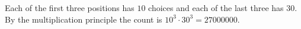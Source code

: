 Each of the first three positions has $10$ choices and each of the last three has $30$. By the multiplication principle the count is $10^3\cdot30^3=\boxed{27000000}$.
